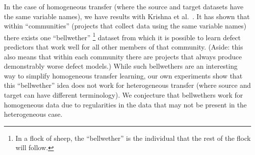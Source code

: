 In the case of homogeneous transfer (where the source and target datasets have the same variable names), we have results with Krishna et al.~\cite{krishna16}. It has shown that within ``communities'' (projects that collect data using the same variable names) there exists one ``bellwether'' \footnote{In a flock of sheep, the ``bellwether'' is the individual that the rest of the flock will follow.} dataset from which it is possible to learn defect predictors that work well for all other members of that community. (Aside: this also means that within each community there are projects that always produce demonstrably worse defect models.) While such bellwethers are an interesting way to simplify homogeneous transfer learning, our own experiments show that this ``bellwether'' idea does not work for heterogeneous transfer (where source and target can have different terminology). We conjecture that bellwethers work for homogeneous data due to regularities in the data that may not be present in the heterogeneous case.
